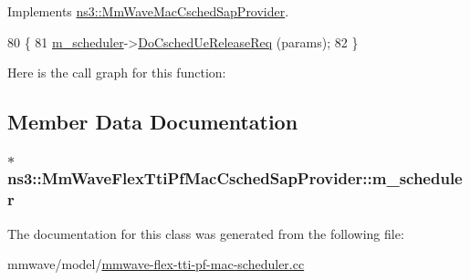 Implements \hyperlink{classns3_1_1MmWaveMacCschedSapProvider_a71346555e5ecb7fecbf27cf5658c1f0c}{ns3\+::\+Mm\+Wave\+Mac\+Csched\+Sap\+Provider}.


\begin{DoxyCode}
80 \{
81   \hyperlink{classns3_1_1MmWaveFlexTtiPfMacCschedSapProvider_ae0f3f43b61c9d0484c507dff27a446e1}{m\_scheduler}->\hyperlink{classns3_1_1MmWaveFlexTtiPfMacScheduler_ae60b6e0fe0f61859e5f57c6a98e67afa}{DoCschedUeReleaseReq} (params);
82 \}
\end{DoxyCode}


Here is the call graph for this function\+:




\subsection{Member Data Documentation}
\subsubsection[{\texorpdfstring{m\+\_\+scheduler}{m_scheduler}}]{$\ast$ ns3\+::\+Mm\+Wave\+Flex\+Tti\+Pf\+Mac\+Csched\+Sap\+Provider\+::m\+\_\+scheduler\hspace{0.3cm}{\ttfamily [private]}}\hypertarget{classns3_1_1MmWaveFlexTtiPfMacCschedSapProvider_ae0f3f43b61c9d0484c507dff27a446e1}{}\label{classns3_1_1MmWaveFlexTtiPfMacCschedSapProvider_ae0f3f43b61c9d0484c507dff27a446e1}


The documentation for this class was generated from the following file\+:\begin{DoxyCompactItemize}
\item 
mmwave/model/\hyperlink{mmwave-flex-tti-pf-mac-scheduler_8cc}{mmwave-\/flex-\/tti-\/pf-\/mac-\/scheduler.\+cc}\end{DoxyCompactItemize}
